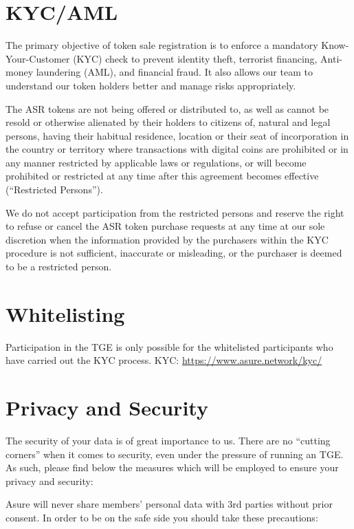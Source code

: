 \newpage 

\section{KYC/AML}

The primary objective of token sale registration is to enforce a mandatory Know-Your-Customer (KYC) check to prevent identity theft, terrorist financing, Anti-money laundering (AML), and financial fraud. It also allows our team to understand our token holders better and manage risks appropriately.

The ASR tokens are not being offered or distributed to, as well as cannot be resold or otherwise alienated by their holders to citizens of, natural and legal persons, having their habitual residence, location or their seat of incorporation in the country or territory where transactions with digital coins are prohibited or in any manner restricted by applicable laws or regulations, or will become prohibited or restricted at any time after this agreement becomes effective (“Restricted Persons”).

We do not accept participation from the restricted persons and reserve the right to refuse or cancel the ASR token purchase requests at any time at our sole discretion when the information provided by the purchasers within the KYC procedure is not sufficient, inaccurate or misleading, or the purchaser is deemed to be a restricted person.

\section{Whitelisting}

Participation in the TGE is only possible for the whitelisted participants who have carried out the KYC process.
\newline\newline
KYC: \url{https://www.asure.network/kyc/}

\section{Privacy and Security}
The security of your data is of great importance to us. There are no “cutting corners” when it comes to security, even under the pressure of running an TGE.  As such, please find below the measures which will be employed to ensure your privacy and security:

Asure will never share members’ personal data with 3rd parties without prior consent. In order to be on the safe side you should take these precautions:


